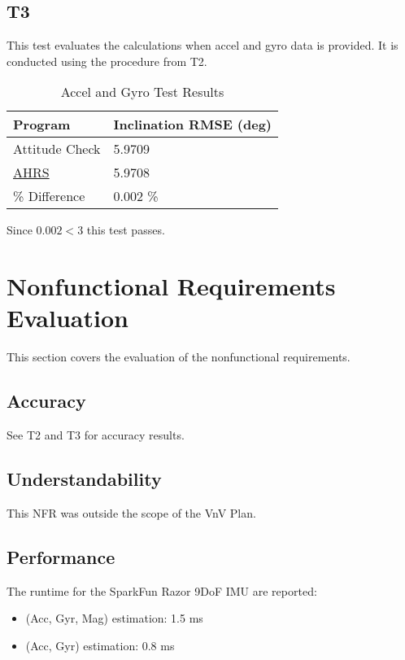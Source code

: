 \documentclass[12pt, titlepage]{article}
\begin{document}
\subsection{T3} This test evaluates the calculations when accel and gyro data is provided. It is
conducted using the procedure from T2.

\begin{table}[H]
    \centering
    \caption{Accel and Gyro Test Results}
    \label{tab:my-table}
    \begin{tabular}{|l|l|}
    \hline
    Program        & Inclination RMSE (deg) \\ \hline
    Attitude Check & 5.9709                 \\ \hline
    \href{https://ahrs.readthedocs.io/en/latest/filters/madgwick.html}{AHRS} & 5.9708 \\ \hline
    \% Difference  & 0.002 \%               \\ \hline
    \end{tabular}
  \end{table}

  Since $0.002 < 3$ this test passes.

\section{Nonfunctional Requirements Evaluation}

This section covers the evaluation of the nonfunctional requirements.

\subsection{Accuracy} \label{acc}

See T2 and T3 for accuracy results.

\subsection{Understandability}

This NFR was outside the scope of the VnV Plan.

\subsection{Performance}

The runtime for the SparkFun Razor 9DoF IMU are reported:

\begin{itemize}
  \item (Acc, Gyr, Mag) estimation: 1.5 ms
  \item (Acc, Gyr) estimation: 0.8 ms
\end{itemize}
\end{document}

